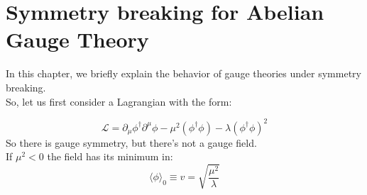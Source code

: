 \chapter{Symmetry breaking for Abelian Gauge Theory}
In this chapter, we briefly explain the behavior of gauge theories under symmetry breaking. \\


So, let us first consider a Lagrangian with the form:

\begin{equation}
    \mathcal{L} = \partial_{\mu}\phi^{\dagger}\partial^{\mu}\phi - \mu^2\left(\phi^{\dagger} \phi\right) - \lambda \left(\phi^ {\dagger}\phi\right)^2
\end{equation}
So there is gauge symmetry, but there's not a gauge field.\\
If $\mu^2<0$ the field has its minimum in:
\begin{equation}
    \langle \phi \rangle_0 \equiv v = \sqrt{\frac{\mu^2}{\lambda}}
\end{equation}



